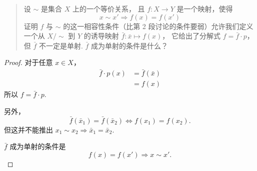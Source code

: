 
\begin{quotation}
    设 $\sim$ 是集合 $X$ 上的一个等价关系，
    且 $f:X \to Y$ 是一个映射，使得
    \[
        x \sim x' \Rightarrow f(x) = f(x')
    \]
    证明 $f$ 与 $\sim$ 的这一相容性条件（比第 2 段讨论的条件要弱）允许我们定义一个从
    $X/\sim$ 到 $Y$ 的诱导映射 $\bar{f}: \bar{x} \mapsto f(x)$，
    它给出了分解式 $f = \bar{f} \cdot p$，
    但 $\bar{f}$ 不一定是单射.
    $\bar{f}$ 成为单射的条件是什么？
\end{quotation}
\begin{proof}
对于任意 $x \in X$，
\begin{equation}
    \begin{aligned}
        \bar{f} \cdot p(x) &= \bar{f}(\bar{x}) \\
        &= f(x)
    \end{aligned}
\end{equation}
    所以 $f = \bar{f} \cdot p$.
    
    另外，
    \begin{equation}
        \bar{f}(\bar{x}_1) = \bar{f}(\bar{x}_2)
        \Leftrightarrow
        f(x_1) = f(x_2).
    \end{equation}
    但这并不能推出 $x_1 \sim x_2 \Rightarrow \bar{x}_1 = \bar{x}_2$.
    
    $\bar{f}$ 成为单射的条件是
    \begin{equation}
        f(x) = f(x') \Rightarrow x \sim x'.
    \end{equation}
\end{proof}


